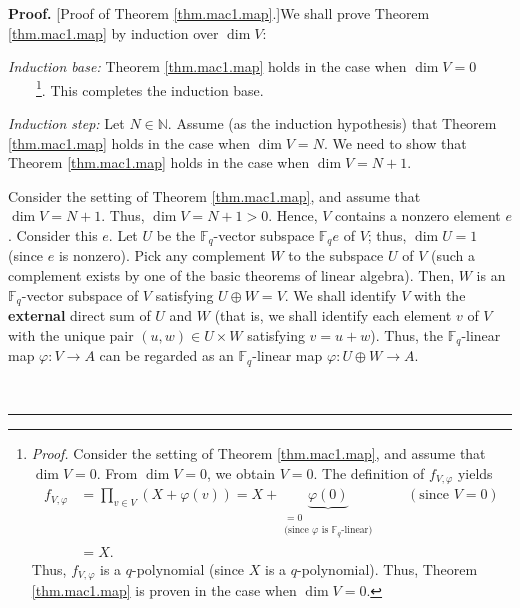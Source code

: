 \documentclass[numbers=enddot,12pt,final,onecolumn,notitlepage]{scrartcl}%
\theoremstyle{definition}
\newenvironment{proof}[1][Proof]{\noindent\textbf{#1.} }{\ \rule{0.5em}{0.5em}}
\let\prodnonlimits\prod
\renewcommand{\prod}{\prodnonlimits\limits}
\begin{document}
\begin{proof}
[Proof of Theorem \ref{thm.mac1.map}.]We shall prove Theorem
\ref{thm.mac1.map} by induction over $\dim V$:

\textit{Induction base:} Theorem \ref{thm.mac1.map} holds in the case when
$\dim V=0$\ \ \ \ \footnote{\textit{Proof.} Consider the setting of Theorem
\ref{thm.mac1.map}, and assume that $\dim V=0$. From $\dim V=0$, we obtain
$V=0$. The definition of $f_{V,\varphi}$ yields%
\begin{align*}
f_{V,\varphi}  &  =\prod_{v\in V}\left(  X+\varphi\left(  v\right)  \right)
=X+\underbrace{\varphi\left(  0\right)  }_{\substack{=0\\\text{(since }%
\varphi\text{ is }\mathbb{F}_{q}\text{-linear)}}}\ \ \ \ \ \ \ \ \ \ \left(
\text{since }V=0\right) \\
&  =X.
\end{align*}
Thus, $f_{V,\varphi}$ is a $q$-polynomial (since $X$ is a $q$-polynomial).
Thus, Theorem \ref{thm.mac1.map} is proven in the case when $\dim V=0$.}. This
completes the induction base.

\textit{Induction step:} Let $N\in\mathbb{N}$. Assume (as the induction
hypothesis) that Theorem \ref{thm.mac1.map} holds in the case when $\dim V=N$.
We need to show that Theorem \ref{thm.mac1.map} holds in the case when $\dim
V=N+1$.

Consider the setting of Theorem \ref{thm.mac1.map}, and assume that $\dim
V=N+1$. Thus, $\dim V=N+1>0$. Hence, $V$ contains a nonzero element $e$.
Consider this $e$. Let $U$ be the $\mathbb{F}_{q}$-vector subspace
$\mathbb{F}_{q}e$ of $V$; thus, $\dim U=1$ (since $e$ is nonzero). Pick any
complement $W$ to the subspace $U$ of $V$ (such a complement exists by one of
the basic theorems of linear algebra). Then, $W$ is an $\mathbb{F}_{q}$-vector
subspace of $V$ satisfying $U\oplus W=V$. We shall identify $V$ with the
\textbf{external} direct sum of $U$ and $W$ (that is, we shall identify each
element $v$ of $V$ with the unique pair $\left(  u,w\right)  \in U\times W$
satisfying $v=u+w$). Thus, the $\mathbb{F}_{q}$-linear map $\varphi
:V\rightarrow A$ can be regarded as an $\mathbb{F}_{q}$-linear map
$\varphi:U\oplus W\rightarrow A$.


\end{proof}
\end{document}
